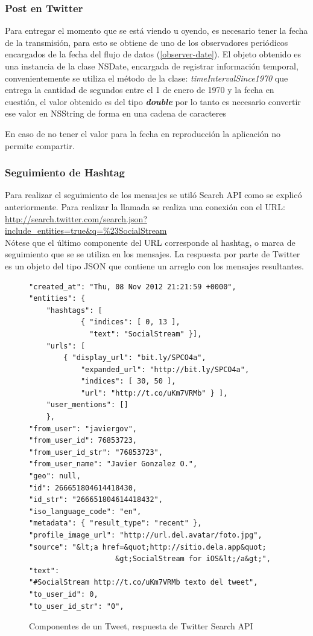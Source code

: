 		\subsubsection{Post en Twitter}
		Para entregar el momento que se está viendo u oyendo, es necesario tener la fecha de la transmisión, para esto se obtiene de uno de los observadores periódicos encargados de la fecha del flujo de datos (\ref{observer-date}). El objeto obtenido es una instancia de la clase NSDate, encargada de registrar información temporal, convenientemente se utiliza el método de la clase: \textit{timeIntervalSince1970} que entrega la cantidad de segundos entre el 1 de enero de 1970 y la fecha en cuestión, el valor obtenido es del tipo \textbf{\textit{double}} por lo tanto es necesario convertir ese valor en NSString de forma  en una cadena de caracteres
		
		
		En caso de no tener el valor para la fecha en reproducción la aplicación no permite compartir.

		\subsubsection{Seguimiento de Hashtag}
		Para realizar el seguimiento de los mensajes se utiló Search API como se explicó anteriormente. Para realizar la llamada se realiza una conexión con el URL: 
\url{http://search.twitter.com/search.json?include_entities=true&q=%23SocialStream} \\
		
		Nótese que el último componente del URL corresponde al hashtag, o marca de seguimiento que se se utiliza en los mensajes. La respuesta por parte de Twitter es un objeto del tipo JSON que contiene un arreglo con los mensajes resultantes.

\begin{figure}[H]
	\centering
	\begin{lstlisting}
"created_at": "Thu, 08 Nov 2012 21:21:59 +0000",
"entities": {
    "hashtags": [
    		{ "indices": [ 0, 13 ], 
    		  "text": "SocialStream" }],
    "urls": [
        { "display_url": "bit.ly/SPCO4a",
            "expanded_url": "http://bit.ly/SPCO4a",
            "indices": [ 30, 50 ],
            "url": "http://t.co/uKm7VRMb" } ],
    "user_mentions": [] 
    },
"from_user": "javiergov",
"from_user_id": 76853723,
"from_user_id_str": "76853723",
"from_user_name": "Javier Gonzalez O.",
"geo": null,
"id": 266651804614418430,
"id_str": "266651804614418432",
"iso_language_code": "en",
"metadata": { "result_type": "recent" },
"profile_image_url": "http://url.del.avatar/foto.jpg",
"source": "&lt;a href=&quot;http://sitio.dela.app&quot;
					&gt;SocialStream for iOS&lt;/a&gt;",
"text": 
"#SocialStream http://t.co/uKm7VRMb texto del tweet",
"to_user_id": 0,
"to_user_id_str": "0",
        	\end{lstlisting}
	\caption{Componentes de un Tweet, respuesta de Twitter Search API}
	\label{tweet-json}	
\end{figure}			

